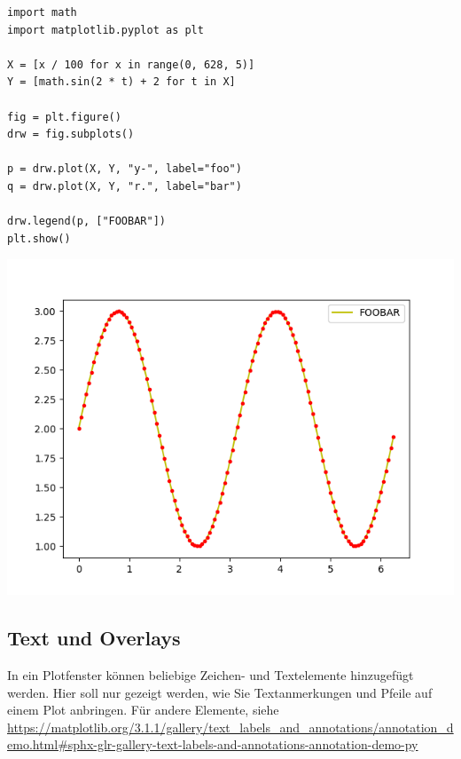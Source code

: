 \begin{codebox}[Beispiel: Legendeneinträge unterdrücken, width=.55\linewidth, nobeforeafter, equal height group = grpXmpLegendSelect]
\begin{verbatim}
import math
import matplotlib.pyplot as plt

X = [x / 100 for x in range(0, 628, 5)]
Y = [math.sin(2 * t) + 2 for t in X]

fig = plt.figure()
drw = fig.subplots()

p = drw.plot(X, Y, "y-", label="foo")
q = drw.plot(X, Y, "r.", label="bar")

drw.legend(p, ["FOOBAR"])
plt.show()
\end{verbatim}
\end{codebox}
%
\begin{tcolorbox}[title=Legendeneinträge unterdrücken, width=.45\linewidth, nobeforeafter, equal height group = grpXmpLegendSelect]
\begin{center}
	\includegraphics[width=\linewidth]{./gfx/plt-legend-select}
\end{center}
\end{tcolorbox}

\subsection{Text und Overlays}
In ein Plotfenster können beliebige Zeichen- und Textelemente hinzugefügt werden. Hier soll nur gezeigt werden, wie Sie Textanmerkungen und Pfeile auf einem Plot anbringen. Für andere Elemente, siehe \url{https://matplotlib.org/3.1.1/gallery/text_labels_and_annotations/annotation_demo.html#sphx-glr-gallery-text-labels-and-annotations-annotation-demo-py}

